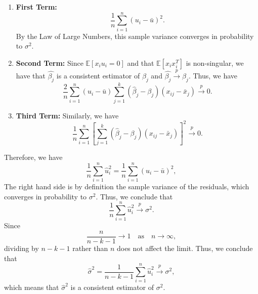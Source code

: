 \documentclass[12pt]{article}
\begin{document}
\begin{flushleft}
\begin{enumerate}
    \item \textbf{First Term:} 
    \[
    \frac{1}{n}\sum_{i=1}^n (u_i-\bar{u})^2.
    \]
    By the Law of Large Numbers, this sample variance converges in probability to \(\sigma^2\).

    \item \textbf{Second Term:} 
    Since $\mathbb{E}[x_i u_i=0]$ and that $\mathbb{E}[x_i x_i^T]$ is non-singular, we have that $\hat{\beta_j}$ is a consistent estimator of $\beta_j$ and $\hat{\beta_j}\xrightarrow{p}\beta_j$. Thus, we have
    \[
    \frac{2}{n}\sum_{i=1}^n (u_i-\bar{u})\sum_{j=1}^k (\hat{\beta}_j-\beta_j)(x_{ij}-\bar{x}_j) \xrightarrow{p} 0.
    \]

    \item \textbf{Third Term:}
    Similarly, we have
    \[
    \frac{1}{n}\sum_{i=1}^n \left[\sum_{j=1}^k (\hat{\beta}_j-\beta_j)(x_{ij}-\bar{x}_j)\right]^2 \xrightarrow{p} 0.
    \]
\end{enumerate}

Therefore, we have
\[
\frac{1}{n}\sum_{i=1}^n \hat{u}_i^2 = \frac{1}{n}\sum_{i=1}^n (u_i-\bar{u})^2 ,
\]
The right hand side is by definition the sample variance of the residuals, which converges in probability to \(\sigma^2\). Thus, we conclude that
\[
\frac{1}{n}\sum_{i=1}^n \hat{u}_i^2 \xrightarrow{p} \sigma^2.
\]
Since
\[
\frac{n}{n-k-1} \to 1 \quad \text{as} \quad n \to \infty,
\]
dividing by \(n-k-1\) rather than \(n\) does not affect the limit. Thus, we conclude that
\[
\hat{\sigma}^2 = \frac{1}{n-k-1}\sum_{i=1}^n \hat{u}_i^2 \xrightarrow{p} \sigma^2,
\]
which means that \(\hat{\sigma}^2\) is a consistent estimator of \(\sigma^2\).

\end{flushleft}
\end{document}
